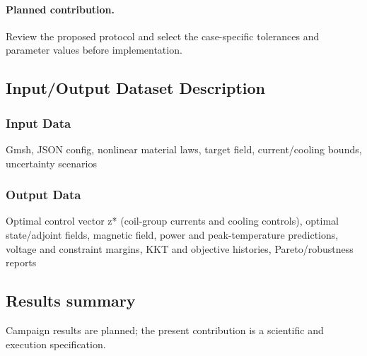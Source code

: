 \paragraph{Planned contribution.} Review the proposed protocol and select the case-specific tolerances and parameter values before implementation.

\subsection{Input/Output Dataset Description}

\subsubsection{Input Data}
Gmsh, JSON config, nonlinear material laws, target field, current/cooling bounds, uncertainty scenarios

\subsubsection{Output Data}
Optimal control vector z* (coil-group currents and cooling controls), optimal state/adjoint fields, magnetic field, power and peak-temperature predictions, voltage and constraint margins, KKT and objective histories, Pareto/robustness reports

\subsection{Results summary}
Campaign results are planned; the present contribution is a scientific and execution specification.


